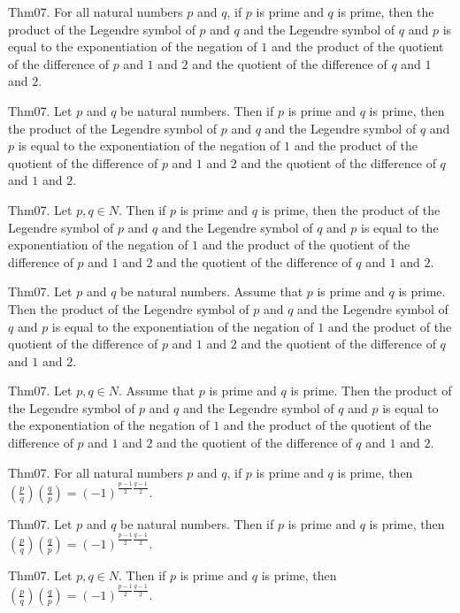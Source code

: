 \documentclass{article}
\begin{document}
Thm07. For all natural numbers $p$ and $q$, if $p$ is prime and $q$ is prime, then the product of the Legendre symbol of $p$ and $q$ and the Legendre symbol of $q$ and $p$ is equal to the exponentiation of the negation of $1$ and the product of the quotient of the difference of $p$ and $1$ and $2$ and the quotient of the difference of $q$ and $1$ and $2$.

Thm07. Let $p$ and $q$ be natural numbers. Then if $p$ is prime and $q$ is prime, then the product of the Legendre symbol of $p$ and $q$ and the Legendre symbol of $q$ and $p$ is equal to the exponentiation of the negation of $1$ and the product of the quotient of the difference of $p$ and $1$ and $2$ and the quotient of the difference of $q$ and $1$ and $2$.

Thm07. Let $p , q \in N$. Then if $p$ is prime and $q$ is prime, then the product of the Legendre symbol of $p$ and $q$ and the Legendre symbol of $q$ and $p$ is equal to the exponentiation of the negation of $1$ and the product of the quotient of the difference of $p$ and $1$ and $2$ and the quotient of the difference of $q$ and $1$ and $2$.

Thm07. Let $p$ and $q$ be natural numbers. Assume that $p$ is prime and $q$ is prime. Then the product of the Legendre symbol of $p$ and $q$ and the Legendre symbol of $q$ and $p$ is equal to the exponentiation of the negation of $1$ and the product of the quotient of the difference of $p$ and $1$ and $2$ and the quotient of the difference of $q$ and $1$ and $2$.

Thm07. Let $p , q \in N$. Assume that $p$ is prime and $q$ is prime. Then the product of the Legendre symbol of $p$ and $q$ and the Legendre symbol of $q$ and $p$ is equal to the exponentiation of the negation of $1$ and the product of the quotient of the difference of $p$ and $1$ and $2$ and the quotient of the difference of $q$ and $1$ and $2$.

Thm07. For all natural numbers $p$ and $q$, if $p$ is prime and $q$ is prime, then $\left(\frac{ p }{ q }\right) \left(\frac{ q }{ p }\right) = {(- 1)}^{ \frac{ p - 1 }{ 2}\frac{ q - 1 }{ 2}}$.

Thm07. Let $p$ and $q$ be natural numbers. Then if $p$ is prime and $q$ is prime, then $\left(\frac{ p }{ q }\right) \left(\frac{ q }{ p }\right) = {(- 1)}^{ \frac{ p - 1 }{ 2}\frac{ q - 1 }{ 2}}$.

Thm07. Let $p , q \in N$. Then if $p$ is prime and $q$ is prime, then $\left(\frac{ p }{ q }\right) \left(\frac{ q }{ p }\right) = {(- 1)}^{ \frac{ p - 1 }{ 2}\frac{ q - 1 }{ 2}}$.
\end{document}
